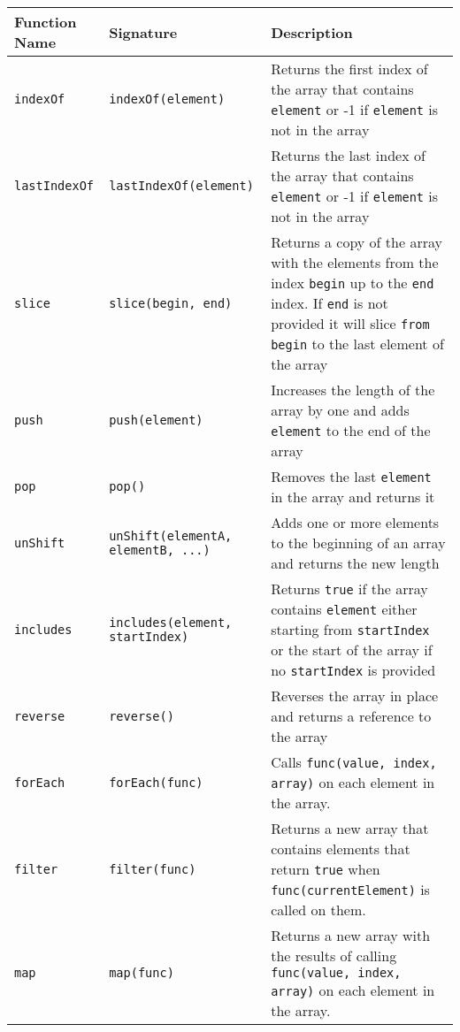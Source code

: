 \documentclass[]{final_report}
\begin{document}
\begin{table}[t]
\centering
\begin{tabular}{|p{2cm}|p{4.2cm}|p{9cm}|}
\hline
Function Name & Signature & Description \\ \hline
\lstinline|indexOf| & {\lstinline|indexOf(element)|} & Returns the first index of the array that contains {\lstinline|element|} or -1 if {\lstinline|element|} is not in the array \\ \hline
\lstinline|lastIndexOf| & {\lstinline|lastIndexOf(element)|} & Returns the last index of the array that contains {\lstinline|element|} or -1 if {\lstinline|element|} is not in the array \\ \hline
\lstinline|slice| & {\lstinline|slice(begin, end)|} & Returns a copy of the array with the elements from the index {\lstinline|begin|} up to the {\lstinline|end|} index. If {\lstinline|end|} is not provided it will slice \lstinline|from| {\lstinline|begin|} to the last element of the array \\ \hline
\lstinline|push| & {\lstinline|push(element)|} & Increases the length of the array by one and adds {\lstinline|element|} to the end of the array \\ \hline
\lstinline|pop| & {\lstinline|pop()|} & Removes the last {\lstinline|element|} in the array and returns it \\ \hline
\lstinline|unShift| & {\lstinline|unShift(elementA, elementB, ...)|} & Adds one or more elements to the beginning of an array and returns the new length \\ \hline
\lstinline|includes| & {\lstinline|includes(element, startIndex)|} & Returns \lstinline|true| if the array contains {\lstinline|element|} either starting from {\lstinline|startIndex|} or the start of the array if no {\lstinline|startIndex|} is provided \\ \hline
\lstinline|reverse| & {\lstinline|reverse()|} & Reverses the array in place and returns a reference to the array \\ \hline
\lstinline|forEach| & {\lstinline|forEach(func)|} & Calls {\lstinline|func(value, index, array)|} on each element in the array. \\ \hline
\lstinline|filter| & {\lstinline|filter(func)|} & Returns a new array that contains elements that return \lstinline|true| when {\lstinline|func(currentElement)|} is called on them. \\ \hline
\lstinline|map| & {\lstinline|map(func)|} & Returns a new array with the results of calling {\lstinline|func(value, index, array)|} on each element in the array. \\ \hline

\end{tabular}
\end{table}
\end{document}
